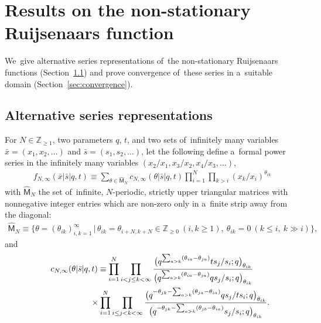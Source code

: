 \documentclass[11pt]{article}
\numberwithin{equation}{section}
\newcommand{\bx}{\bar{x}}
\newcommand{\bs}{\bar{s}}
\newcommand{\Z}{{\mathbb Z}}
\begin{document}
\setcounter{section}{2}
\setcounter{subsection}{2}
\setcounter{subsubsection}{0}
\setcounter{Theorem}{3}
\setcounter{equation}{12}
\section{Results on the non-stationary Ruijsenaars function}\label{sec:results}

We~give alternative series representations of~the non-stationary Ruijsenaars functions (Section~\ref{sec:alternative}) and prove convergence of~these series in a~suitable domain (Section~\ref{sec:convergence}).
\subsection{Alternative series representations}
\label{sec:alternative}

\setcounter{section}{3}
\setcounter{subsection}{1}
\setcounter{subsubsection}{0}
\setcounter{Theorem}{0}
\setcounter{equation}{0}
\begin{Definition}
\label{def2}
For $N\in\Z_{\geq 1}$, two parameters $q$, $t$, and two sets of~infinitely many variables $\bx=(x_1,x_2,\dots)$ and $\bs=(s_1,s_2,\dots)$, let the following define a~formal power series in the infinitely many variables
$(x_2/x_1,x_3/x_2,x_4/x_3,\dots)$,
\begin{gather}
\label{fNinfty}
 f_{N,\infty}(\bx|\bs|q,t) \equiv \sum_{\theta\in\hat{\mathsf{M}}_N} c_{N,\infty}(\theta|\bs|q,t) \prod_{i=1}^N \prod_{k>i} (x_k/x_i)^{\theta_{ik}}
\end{gather}
with $\hat{\mathsf{M}}_N$ the set of~infinite, $N$-periodic, strictly upper triangular matrices with nonnegative integer entries which are non-zero only in a~finite strip away from the diagonal:
\begin{gather}
\label{hMMN}
\hat{\mathsf{M}}_N\equiv \big\{ \theta=(\theta_{ik})_{i,k=1}^\infty\,|\, \theta_{ik}=\theta_{i+N,k+N}\in\Z_{\geq 0}\ (i,k\geq 1), \ \theta_{ik}=0\ (k\leq i,\ k\gg i)\big\} ,
\end{gather}
and
\begin{gather}
c_{N,\infty}(\theta|\bs|q,t)
\equiv
\prod_{i=1}^N \prod_{i< j\leq k< \infty}
\frac{\big(q^{\sum_{a> k}(\theta_{ia} - \theta_{ja})}ts_{j}/s_i;q\big)_{\theta_{ik}}}{\big(q^{\sum_{a> k}(\theta_{ia} - \theta_{ja})}qs_{j}/s_i;q\big)_{\theta_{ik}}}\nonumber
\\ \hphantom{c_{N,\infty}(\theta|\bs|q,t)\equiv }
{}\times\prod_{i=1}^N \prod_{i\leq j<k<\infty}
\frac{\big(q^{-\theta_{jk}-\sum_{a>k}(\theta_{ja}-\theta_{ia})}qs_{j}/ts_i ;q\big)_{\theta_{ik}}}{\big(q^{-\theta_{jk}-\sum_{a>k}(\theta_{jb}-\theta_{ia})}s_{j}/s_i ;q\big)_{\theta_{ik}}} .
\label{cNinfty}
\end{gather}

\end{Definition}
\end{document}
